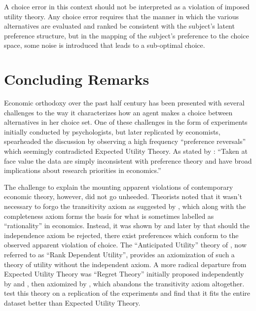 \documentclass[../main.tex]{subfiles}
\begin{document}
A choice error in this context should not be interpreted as a violation of imposed utility theory.
Any choice error requires that the manner in which the various alternatives are evaluated and ranked be consistent with the subject's latent preference structure, but in the mapping of the subject's preference to the choice space, some noise is introduced that leads to a sub-optimal choice.

\section{Concluding Remarks}

Economic orthodoxy over the past half century has been presented with several challenges to the way it characterizes how an agent makes a choice between alternatives in her choice set.
One of these challenges in the form of experiments initially conducted by psychologists, but later replicated by economists, spearheaded the discussion by observing a high frequency \enquote{preference reversals} which seemingly contradicted Expected Utility Theory.
As stated by \textcite{Grether1979}: \enquote{Taken at face value the data are simply inconsistent with preference theory and have broad implications about research priorities in economics.}

The challenge to explain the mounting apparent violations of contemporary economic theory, however, did not go unheeded.
Theorists noted that it wasn't necessary to forgo the transitivity axiom as suggested by \textcite[623]{Grether1979}, which along with the completeness axiom forms the basis for what is sometimes labelled as \enquote{rationality} in economics.
Instead, it was shown by \textcite{Holt1986} and later by \textcite{Karni1987} that should the independence axiom be rejected, there exist preferences which conform to the observed apparent violation of choice.
The \enquote{Anticipated Utility} theory of \textcite{Quiggin1982}, now referred to as \enquote{Rank Dependent Utility}, provides an axiomization of such a theory of utility without the independent axiom.
A more radical departure from Expected Utility Theory was \enquote{Regret  Theory} initially proposed independently by \textcite{Bell1982} and \textcite{Loomes1982}, then axiomized by \textcite{Fishburn1987}, which abandons the transitivity axiom altogether.
\textcite{Loomes1989} test this theory on a replication of the \textcite{Grether1979} experiments and find that it fits the entire dataset better than Expected Utility Theory.
\end{document}
